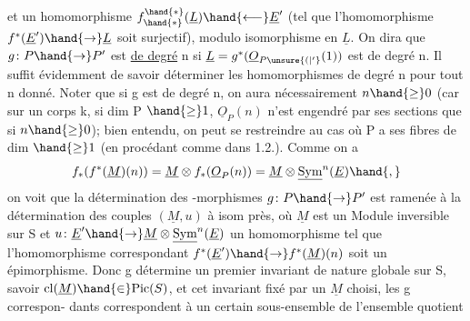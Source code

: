 
et  un homomorphisme  $f^{\hand{*}}_{\hand{*}}(\underline{L}) \hand{\longleftarrow} \underline{E}'$  (tel que l'homomorphisme 
$f^{*}(\underline{E}') \hand{\to} \underline{L}$  soit surjectif), modulo  isomorphisme en $\underline{L}$.  On dira que
$g\colon P \hand{\to} P'$  est \uline{de degré} n si $\underline{L} = g^{*}(\underline{O}_{P\unsure{(|'}}(1))$  est de degré n. Il suffit
évidemment de savoir déterminer les homomorphismes de degré n pour tout n
donné.  Noter que si g est de degré n, on aura nécessairement $n \hand{\geq} 0$
(car  sur un corps k,  si dim P $\hand{\geq} 1$, $\underline{O}_P(n)$ n'est engendré par ses
sections que si $n \hand{\geq} 0$); bien entendu, on peut  se restreindre au cas
où P a ses fibres de dim $\hand{\geq} 1$ (en procédant comme dans 1.2.).  Comme on a
\[ f_{*}(f^{*}(\underline{M})(n)) = \underline{M} \otimes f_{*}(\underline{O}_P(n)) = \underline{M} \otimes \underline{\mathrm{Sym}}^{n}(\underline{E}) \hand{,} \]
on voit que la détermination des -morphismes  $g\colon P \hand{\to} P'$  est ramenée
à la détermination des couples $(\underline{M},u)$ à isom près, où $\underline{M}$  est un Module
inversible sur S et  $u\colon \underline{E}' \hand{\to} \underline{M}\otimes\underline{\mathrm{Sym}}^{n}(\underline{E})$  un homomorphisme  tel que
l'homomorphisme correspondant  $f^{*}(\underline{E}') \hand{\to} f^{*}(\underline{M})(n)$  soit un épimorphisme.
Donc  g détermine un premier invariant de nature globale sur S, savoir
$\mathrm{cl}(\underline{M}) \hand{\in} \mathrm{Pic}(S)$, et cet invariant fixé par un $\underline{M}$ choisi,  les g correspon-%
dants correspondent à un certain sous-ensemble de l'ensemble quotient
